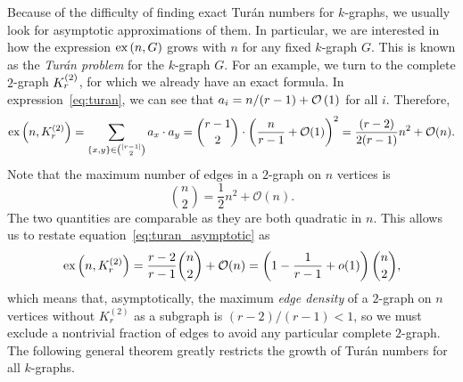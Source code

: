 Because of the difficulty of finding exact Turán numbers for $k$-graphs,
we usually look for asymptotic approximations of them.
In particular, we are interested in how the expression
$\text{ex} \left( n, G \right)$ grows with $n$ for any fixed $k$-graph $G$.
This is known as the \emph{Turán problem} for the $k$-graph $G$.
For an example, we turn to the complete $2$-graph $K^{(2)}_{r}$,
for which we already have an exact formula.
In expression~\eqref{eq:turan}, we can see that
$a_i = n/(r-1) + \mathcal{O}\left(1\right)$ for all $i$.
Therefore,
\begin{equation} \label{eq:turan_asymptotic}
    \text{ex} \left( n, K^{(2)}_{r} \right) = \sum_{\{x, y\} \in \binom{[r-1]}{2}} a_x \cdot a_y
    = \binom{r-1}{2} \cdot \left( \frac{n}{r-1} + \mathcal{O}(1) \right)^2
    = \frac{(r-2)}{2(r-1)} n^2 + \mathcal{O}(n).
\end{equation}
Note that the maximum number of edges in a $2$-graph on $n$ vertices is
\[
    \binom{n}{2} = \frac{1}{2} n^2 + \mathcal{O}(n).
\]
The two quantities are comparable as they are both quadratic in $n$.
This allows us to restate equation~\eqref{eq:turan_asymptotic} as
\begin{equation} \label{eq:turan_asymptotic_density}
    \text{ex} \left( n, K^{(2)}_{r} \right) =
    \frac{r-2}{r-1} \binom{n}{2} + \mathcal{O}(n) =
    \left(1 - \frac{1}{r-1} + o(1)\right)\binom{n}{2},
\end{equation}
which means that, asymptotically, the maximum \emph{edge density} of a $2$-graph on $n$ vertices
without $K_r^{(2)}$ as a subgraph is $(r-2)/(r-1) < 1$, so we must exclude a nontrivial fraction of edges
to avoid any particular complete $2$-graph.
The following general theorem greatly restricts the growth of Turán numbers
for all $k$-graphs.

